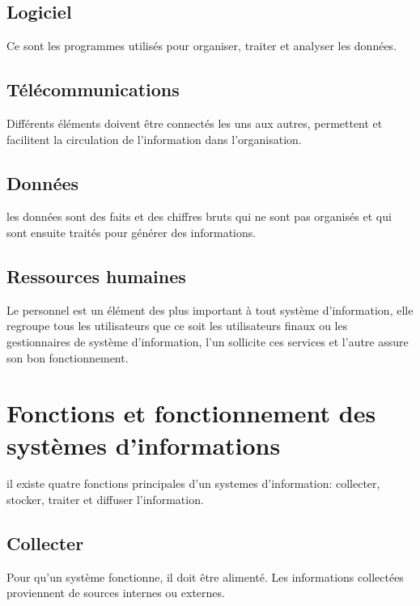 \subsection{Logiciel }
\par Ce sont les programmes utilisés pour organiser, traiter et analyser les
données.\cite{ref11}

\subsection{Télécommunications }
\par Différents éléments doivent être connectés les uns aux autres, permettent
et facilitent la circulation de l’information dans l’organisation.\cite{ref12}

\subsection{Données }
\par les données sont des faits et des chiffres bruts qui ne sont pas organisés
et qui sont ensuite traités pour générer des informations.\cite{ref12}

\subsection{Ressources humaines }
\par Le personnel est un élément des plus important à tout système
d’information, elle regroupe tous les utilisateurs que ce soit les utilisateurs
finaux ou les gestionnaires de système d’information, l’un sollicite ces
services et l’autre assure son bon fonctionnement.\cite{ref12}

\section{Fonctions et fonctionnement des systèmes d’informations }
\par il existe quatre fonctions principales d'un systemes d'information:
collecter, stocker, traiter et diffuser l’information.\cite{ref13}

\subsection{Collecter }
\par Pour qu'un système fonctionne, il doit être alimenté. Les informations
collectées proviennent de sources internes ou externes. 

